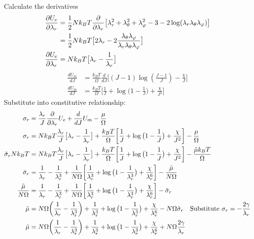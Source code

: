 \documentclass[12pt,3p]{article}
\numberwithin{equation}{section}
\begin{document}
Calculate the derivatives
\begin{align*}
\pdv{U_e}{\lambda_r} &= \frac{1}{2} N k_B T \pdv{}{\lambda_r} \big[ \lambda_r^2 + \lambda_\theta^2 + \lambda_\varphi^2 - 3 - 2 \log (\lambda_r \lambda_\theta \lambda_\varphi) \big] \\
				 &= \frac{1}{2} N k_B T \big[ 2 \lambda_r - 2 \frac{\lambda_\theta \lambda_\varphi}{\lambda_r \lambda_\theta \lambda_\varphi} \big] \\
\pdv{U_e}{\lambda_r} &= N k_B T \big[ \lambda_r - \frac{1}{\lambda_r} \big] 
\end{align*}
\begin{align*}
\frac{dU_m}{dJ} &= \frac{k_B T}{\Omega} \frac{d}{dJ} \bigg[ (J- 1) \log (\frac{J - 1}{J}) - \frac{\chi}{J} \bigg] \\
\frac{dU_m}{dJ} &= \frac{k_B T}{\Omega} \bigg[ \frac{1}{J} + \log \big( 1 - \frac{1}{J} \big) + \frac{\chi}{J^2} \bigg]
\end{align*}
Substitute into constitutive relationship:
\begin{align*}
\sigma_r &= \frac{\lambda_r}{J} \pdv{}{\lambda_r} U_e + \frac{d}{dJ} U_m - \frac{\mu}{\Omega} \\
\sigma_r &= N k_B T \frac{\lambda_r}{J} \big[ \lambda_r - \frac{1}{\lambda_r} \big] + \frac{k_B T}{\Omega} \bigg[ \frac{1}{J} + \log \big( 1 - \frac{1}{J} \big) + \frac{\chi}{J^2} \bigg] - \frac{\mu}{\Omega} \\
\tilde{\sigma}_r N k_B T &= N k_B T \frac{\lambda_r}{J} \big[ \lambda_r - \frac{1}{\lambda_r} \big] + \frac{k_B T}{\Omega} \bigg[ \frac{1}{J} + \log \big( 1 - \frac{1}{J} \big) + \frac{\chi}{J^2} \bigg] - \frac{\tilde{\mu} k_B T}{\Omega} \\
\tilde{\sigma}_r &= \frac{1}{\lambda_r} - \frac{1}{\lambda_r^3} + \frac{1}{N \Omega} \bigg[ \frac{1}{\lambda_r^3} + \log \big( 1 - \frac{1}{\lambda_r^3} \big) + \frac{\chi}{\lambda_r^6} \bigg] - \frac{\tilde{\mu}}{N \Omega} \\
\frac{\tilde{\mu}}{N \Omega} &= \frac{1}{\lambda_r} - \frac{1}{\lambda_r^3} + \frac{1}{N \Omega} \bigg[ \frac{1}{\lambda_r^3} + \log \big( 1 - \frac{1}{\lambda_r^3} \big) + \frac{\chi}{\lambda_r^6} \bigg] - \tilde{\sigma}_r \\
\tilde{\mu} &= N \Omega \bigg( \frac{1}{\lambda_r} - \frac{1}{\lambda_r^3} \bigg) + \frac{1}{\lambda_r^3} + \log \big( 1 - \frac{1}{\lambda_r^3} \big) + \frac{\chi}{\lambda_r^6} - N \Omega \tilde{\sigma}_r \quad \text{Substitute } \sigma_r = - \frac{2 \gamma}{\lambda_r} \\
\tilde{\mu} &= N \Omega \bigg( \frac{1}{\lambda_r} - \frac{1}{\lambda_r^3} \bigg) + \frac{1}{\lambda_r^3} + \log \big( 1 - \frac{1}{\lambda_r^3} \big) + \frac{\chi}{\lambda_r^6} + N \Omega \frac{2 \gamma}{\lambda_r}
\end{align*} 
\end{document}
